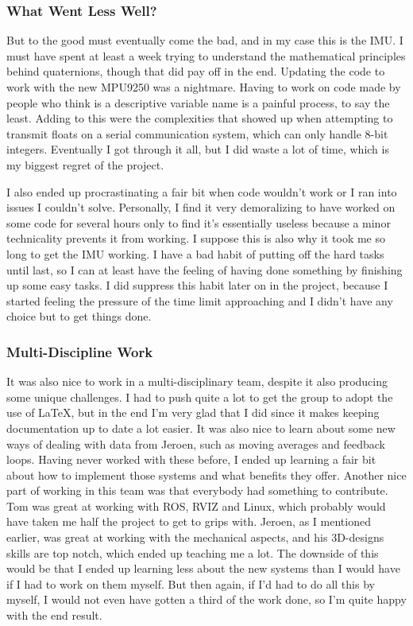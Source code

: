 \subsubsection{What Went Less Well?}
But to the good must eventually come the bad, and in my case this is the IMU.
I must have spent at least a week trying to understand the mathematical principles behind quaternions, though that did pay off in the end.
Updating the code to work with the new MPU9250 was a nightmare.
Having to work on code made by people who think  is a descriptive variable name is a painful process, to say the least.
Adding to this were the complexities that showed up when attempting to transmit floats on a serial communication system, which can only handle 8-bit integers.
Eventually I got through it all, but I did waste a lot of time, which is my biggest regret of the project.

I also ended up procrastinating a fair bit when code wouldn't work or I ran into issues I couldn't solve.
Personally, I find it very demoralizing to have worked on some code for several hours only to find it's essentially useless because a minor technicality prevents it from working.
I suppose this is also why it took me so long to get the IMU working.
I have a bad habit of putting off the hard tasks until last, so I can at least have the feeling of having done something by finishing up some easy tasks.
I did suppress this habit later on in the project, because I started feeling the pressure of the time limit approaching and I didn't have any choice but to get things done.

\subsubsection{Multi-Discipline Work}
It was also nice to work in a multi-disciplinary team, despite it also producing some unique challenges.
I had to push quite a lot to get the group to adopt the use of \LaTeX, but in the end I'm very glad that I did since it makes keeping documentation up to date a lot easier.
It was also nice to learn about some new ways of dealing with data from Jeroen, such as moving averages and feedback loops.
Having never worked with these before, I ended up learning a fair bit about how to implement those systems and what benefits they offer.
Another nice part of working in this team was that everybody had something to contribute.
Tom was great at working with ROS, RVIZ and Linux, which probably would have taken me half the project to get to grips with.
Jeroen, as I mentioned earlier, was great at working with the mechanical aspects, and his 3D-designs skills are top notch, which ended up teaching me a lot.
The downside of this would be that I ended up learning less about the new systems than I would have if I had to work on them myself.
But then again, if I'd had to do all this by myself, I would not even have gotten a third of the work done, so I'm quite happy with the end result.



\newpage
